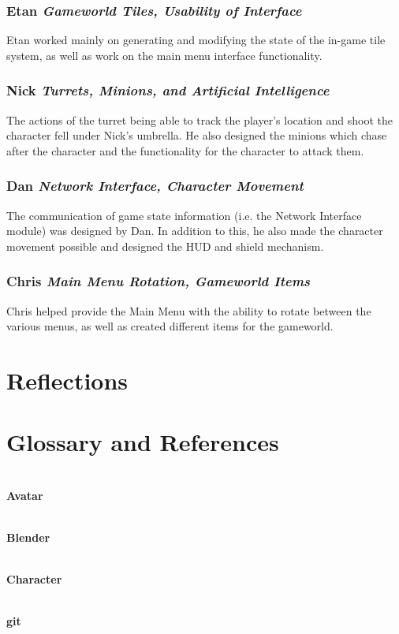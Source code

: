 \documentclass[10pt,letterpaper,oneside,english]{article}
\newcommand{\gls}[2]{ \ \\ \hspace*{1em} \textbf{#1} \ \\ \hspace*{1.5em}{#2}}
\begin{document}
\subsubsection{Etan \textit{Gameworld Tiles, Usability of Interface}}
Etan worked mainly on generating and modifying the state of the in-game tile system, as well as work on the main menu interface functionality.

\subsubsection{Nick \textit{Turrets, Minions, and Artificial Intelligence}}
The actions of the turret being able to track the player’s location and shoot the character fell under Nick’s umbrella. He also designed the minions which chase after the character and the functionality for the character to attack them.

\subsubsection{Dan \textit{Network Interface, Character Movement}}
The communication of game state information (i.e. the Network Interface module) was designed by Dan. In addition to this, he also made the character movement possible and designed the HUD and shield mechanism.

\subsubsection{Chris \textit{Main Menu Rotation, Gameworld Items}}
Chris helped provide the Main Menu with the ability to rotate between the various menus, as well as created different items for the gameworld.

\section{Reflections}

\section{Glossary and References}

\gls{Avatar}{See Character}

\gls{Blender}{An application for creating models and animations.}

\gls{Character}{The game object controlled by persons using the Kinect}

\gls{git}{A distributed version control system, which tracks and annotates changes to code.}
\end{document}
